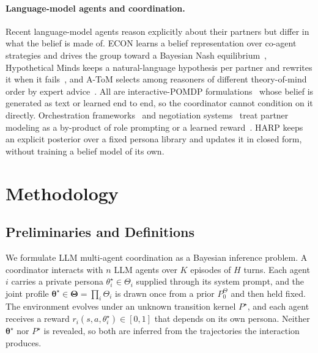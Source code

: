 \documentclass[letterpaper]{article} %
\begin{document}
\paragraph{Language-model agents and coordination.} Recent language-model agents reason explicitly about their partners but differ in what the belief is made of. ECON learns a belief representation over co-agent strategies and drives the group toward a Bayesian Nash equilibrium~\citep{yi2025debate}, Hypothetical Minds keeps a natural-language hypothesis per partner and rewrites it when it fails~\citep{cross2025hypothetical,li2023theory}, and A-ToM selects among reasoners of different theory-of-mind order by expert advice~\citep{mu2026adaptive,cesa1997use}. All are interactive-POMDP formulations~\citep{gmytrasiewicz2005framework} whose belief is generated as text or learned end to end, so the coordinator cannot condition on it directly. Orchestration frameworks~\citep{wu2023autogen,li2023camel,hong2024metagpt,park2023generative,chen2023autoagents} and negotiation systems~\citep{meta2022human,abdulhai2023lmrl} treat partner modeling as a by-product of role prompting or a learned reward~\citep{agashe2025llm}. HARP keeps an explicit posterior over a fixed persona library and updates it in closed form, without training a belief model of its own.

\section{Methodology}
\label{sec:algorithm}

\subsection{Preliminaries and Definitions}
\label{sec:setting-main}

We formulate LLM multi-agent coordination as a Bayesian inference problem. A coordinator interacts with $n$ LLM agents over $K$ episodes of $H$ turns. Each agent $i$ carries a private persona $\theta_i^\star \in \Theta_i$ supplied through its system prompt, and the joint profile $\boldsymbol\theta^\star \in \boldsymbol\Theta = \prod_i \Theta_i$ is drawn once from a prior $P_0^\Theta$ and then held fixed. The environment evolves under an unknown transition kernel $P^\star$, and each agent receives a reward $r_i(s,a,\theta_i^\star)\in[0,1]$ that depends on its own persona. Neither $\boldsymbol\theta^\star$ nor $P^\star$ is revealed, so both are inferred from the trajectories the interaction produces.
\end{document}
